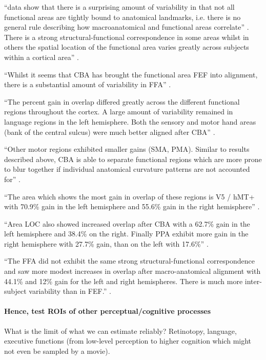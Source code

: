 ``data show that there is a surprising amount of variability in that not all
functional areas are tightly bound to anatomical landmarks, i.e. there is no
general rule describing how macroanatomical and functional areas correlate''
\citep{frost2012measuring}.
%
There is a strong structural-functional correspondence in some areas whilst in
others the spatial location of the functional area varies greatly across
subjects within a cortical area'' \citep{frost2012measuring}.

``Whilst it seems that CBA has brought the functional area FEF into alignment,
there is a substantial amount of variability in FFA''
\citep{frost2012measuring}.

``The percent gain in overlap differed greatly across the different functional
regions throughout the cortex.
%
A large amount of variability remained in language regions in the left
hemisphere.
%
Both the sensory and motor hand areas (bank of the central sulcus) were much
better aligned after CBA'' \citep{frost2012measuring}.

``Other motor regions exhibited smaller gains (SMA, PMA).
%
Similar to results described above, CBA is able to separate functional regions
which are more prone to blur together if individual anatomical curvature
patterns are not accounted for'' \citep{frost2012measuring}.

``The area which shows the most gain in overlap of these regions is V5 / hMT+
with 70.9\% gain in the left hemisphere and 55.6\% gain in the right
hemisphere'' \citep{frost2012measuring}.

``Area LOC also showed increased overlap after CBA with a 62.7\% gain in the
left hemisphere and 38.4\% on the right.
%
Finally PPA exhibit more gain in the right hemisphere with 27.7\% gain, than on
the left with 17.6\%'' \citep{frost2012measuring}.

``The FFA did not exhibit the same strong structural-functional correspondence
and saw more modest increases in overlap after macro-anatomical alignment with
44.1\% and 12\% gain for the left and right hemispheres.
%
There is much more inter-subject variability than in FEF.''
\citep{frost2012measuring}.


\paragraph{Hence, test ROIs of other perceptual/cognitive processes}

What is the limit of what we can estimate reliably?
%
Retinotopy, language, executive functions (from low-level perception to higher
cognition which might not even be sampled by a movie).

